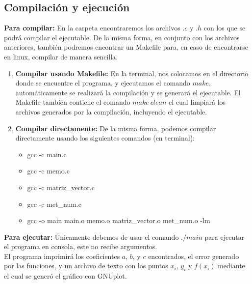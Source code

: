 \documentclass[12pt]{article}
\begin{document}
\begin{figure}[H]
	\centering
	\hfill
\end{figure}

\subsection{Compilación y ejecución}
\textbf{Para compilar:} En la carpeta encontraremos los archivos $.c$ y $.h$ con los que se podrá compilar el ejecutable. De la misma forma, en conjunto con los archivos anteriores, también podremos encontrar un Makefile para, en caso de encontrarse en linux, compilar de manera sencilla.

\begin{enumerate}
	\item \textbf{Compilar usando Makefile:} En la terminal, nos colocamos en el directorio donde se encuentre el programa, y ejecutamos el comando $make$, automáticamente se realizará la compilación y se generará el ejecutable. El Makefile también contiene el comando $make\ clean$ el cual limpiará los archivos generados por la compilación, incluyendo el ejecutable.
	\item \textbf{Compilar directamente:} De la misma forma, podemos compilar directamente usando los siguientes comandos (en terminal):
	\begin{itemize}
		\item gcc -c main.c
		\item gcc -c memo.c
		\item gcc -c matriz\_vector.c
		\item gcc -c met\_num.c
		\item gcc -o main main.o memo.o matriz\_vector.o met\_num.o -lm
	\end{itemize}
\end{enumerate}

\textbf{Para ejecutar:} Únicamente debemos de usar el comando $./main$ para ejecutar el programa en consola, este no recibe argumentos.\\
El programa imprimirá los coeficientes $a$, $b$, y $c$ encontrados, el error generado por las funciones, y un archivo de texto con los puntos $x_i$, $y_i$ y $f(x_i)$ mediante el cual se generó el gráfico con GNUplot.
\end{document}
